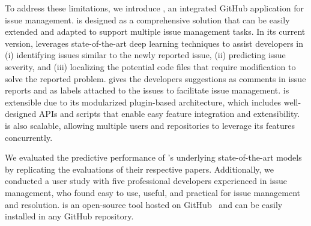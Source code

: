 
To address these limitations, we introduce \toolname, an integrated GitHub application for issue management. \toolname is designed as a comprehensive solution that can be easily extended and adapted to support multiple issue management tasks. In its current version, \toolname leverages state-of-the-art deep learning techniques to assist developers in (i) identifying issues similar to the newly reported issue, (ii) predicting issue severity, and (iii) localizing the potential code files that require modification to solve the reported problem. \toolname gives the developers suggestions as comments in issue reports and as labels attached to the issues to facilitate issue management. \toolname is extensible due to its modularized plugin-based architecture, which includes well-designed APIs and scripts that enable easy feature integration and extensibility. \toolname is also scalable, allowing multiple users and repositories to leverage its features concurrently. 

We evaluated the predictive performance of \toolname's underlying state-of-the-art models by replicating the evaluations of their respective papers. Additionally, we conducted a user study with five professional developers experienced in issue management, who found \toolname easy to use, useful, and practical for issue management and resolution. \toolname is an open-source tool hosted on GitHub~\cite{repl_pack} and can be easily installed in any GitHub repository.
